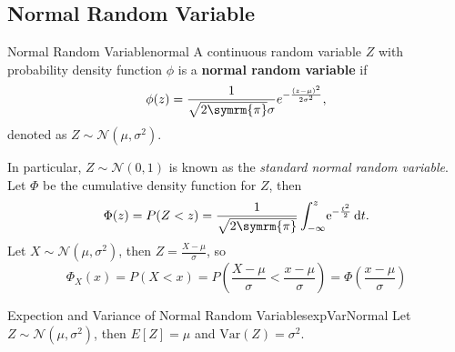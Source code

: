 \documentclass[math]{amznotes}
\theoremstyle{remark}
\begin{document}
\subsection{Normal Random Variable}
\begin{dfnbox}{Normal Random Variable}{normal}
    A continuous random variable $Z$ with probability density function $\phi$ is a {\color{red} \textbf{normal random variable}} if 
    \begin{equation*}
        \phi(z) = \frac{1}{\sqrt{2\symrm{\pi}}\sigma}e^{-\frac{(z - \mu)^2}{2\sigma^2}},
    \end{equation*}
    denoted as $Z \sim \mathcal{N}\left(\mu, \sigma^2\right)$.
\end{dfnbox}
In particular, $Z \sim \mathcal{N}(0, 1)$ is known as the \textit{standard normal random variable}. Let $\Phi$ be the cumulative density function for $Z$, then 
\begin{equation*}
    \Phi(z) = P(Z < z) = \frac{1}{\sqrt{2\symrm{\pi}}}\int_{-\infty}^{z}\!\mathrm{e}^{-\frac{t^2}{2}} \,\mathrm{d}t.
\end{equation*}
Let $X \sim \mathcal{N}(\mu, \sigma^2)$, then $Z = \frac{X - \mu}{\sigma}$, so
\begin{equation*}
    \Phi_X(x) = P\left(X < x\right) = P\left(\frac{X - \mu}{\sigma} < \frac{x - \mu}{\sigma}\right) = \Phi\left(\frac{x - \mu}{\sigma}\right)
\end{equation*}
\begin{thmbox}{Expection and Variance of Normal Random Variables}{expVarNormal}
    Let $Z \sim \mathcal{N}(\mu, \sigma^2)$, then $E[Z] = \mu$ and $\mathrm{Var}(Z) = \sigma^2$.
\end{thmbox}
\end{document}
